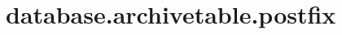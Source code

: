 \section{database.archivetable.postfix}
\label{configuration:DatabaseArchivetablePostfix}
\AvailableInJavaOnly{\TODO}